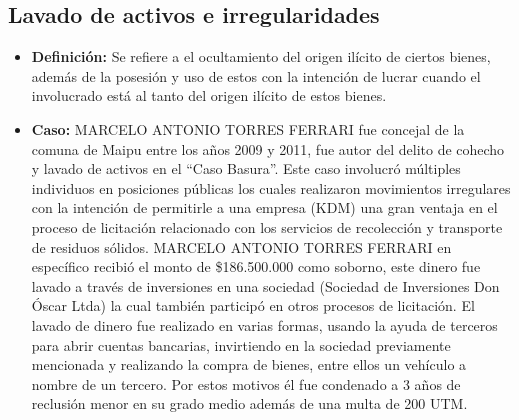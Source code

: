\documentclass[letter,12pt]{article}
\begin{document}
		\subsection*{Lavado de activos e irregularidades}
			\begin{itemize}
				\item \textbf{Definición:} Se refiere a el ocultamiento del origen ilícito de ciertos bienes, además de la posesión y uso de estos con la intención de lucrar cuando el involucrado está al tanto del origen ilícito de estos bienes.
			
				\item \textbf{Caso:} MARCELO ANTONIO TORRES FERRARI fue concejal de la comuna de Maipu entre los años 2009 y 2011, fue autor del delito de cohecho y lavado de activos en el “Caso Basura”. Este caso involucró múltiples individuos en posiciones públicas los cuales realizaron movimientos irregulares con la intención de permitirle a una empresa (KDM) una gran ventaja en el proceso de licitación relacionado con los servicios de recolección y transporte de residuos sólidos. MARCELO ANTONIO TORRES FERRARI en específico recibió el monto de \$186.500.000 como soborno, este dinero fue lavado a través de inversiones en una sociedad (Sociedad de Inversiones Don Óscar Ltda) la cual también participó en otros procesos de licitación. El lavado de dinero fue realizado en varias formas, usando la ayuda de terceros para abrir cuentas bancarias, invirtiendo en la sociedad previamente mencionada y realizando la compra de bienes, entre ellos un vehículo a nombre de un tercero. Por estos motivos él fue condenado a 3 años de reclusión menor en su grado medio además de una multa de 200 UTM.
			\end{itemize}
			
\end{document}
